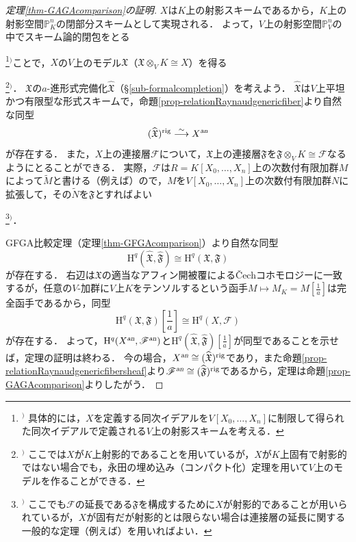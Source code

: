 \documentclass[a4paper,12pt, dvipdfmx]{jsbook}
\def\P{\mathbb{P}}
\def\til#1{\widetilde{#1}}%
\def\rig{\mathop{\mathrm{rig}}\nolimits}
\def\H{\mathrm{H}}
\def\an{\textsl{an}}
\theoremstyle{plain}
\theoremstyle{definition}
\newcounter{chushaku}
\def\chu#1{\addtocounter{chushaku}{1}\footnote[\value{chushaku}]{${}^)$ #1}${}^)$}
\begin{document}
\begin{proof}[定理{\rm \ref{thm-GAGAcomparison}}の証明]
$X$は$K$上の射影スキームであるから，$K$上の射影空間$\P^n_K$の閉部分スキームとして実現される．
よって，$V$上の射影空間$\P^n_V$の中でスキーム論的閉包をとる\chu{具体的には，$X$を定義する同次イデアルを$V[X_0,\ldots,X_n]$に制限して得られた同次イデアルで定義される$V$上の射影スキームを考える．}ことで，$X$の$V$上のモデル$\mathfrak{X}$（$\mathfrak{X}\otimes_VK\cong X$）を得る\chu{ここでは$X$が$K$上射影的であることを用いているが，$X$が$K$上固有で射影的ではない場合でも，永田の埋め込み（コンパクト化）定理を用いて$V$上のモデルを作ることができる．}．
$\mathfrak{X}$の$a$-進形式完備化$\widehat{\mathfrak{X}}$（\S\ref{sub-formalcompletion}）を考えよう．
$\widehat{\mathfrak{X}}$は$V$上平坦かつ有限型な形式スキームで，命題\ref{prop-relationRaynaudgenericfiber}より自然な同型
$$
(\widehat{\mathfrak{X}})^{\rig}\stackrel{\sim}{\longrightarrow}X^{\an}
$$
が存在する．
また，$X$上の連接層$\mathscr{F}$について，$\mathfrak{X}$上の連接層$\mathfrak{F}$を$\mathfrak{F}\otimes_VK\cong\mathscr{F}$なるようにとることができる．
実際，$\mathscr{F}$は$R=K[X_0,\ldots,X_n]$上の次数付有限加群$M$によって$\til{M}$と書ける（例えば\cite[Chap.\ II, Prop.\ 5.15]{Hart2}）ので，$M$を$V[X_0,\ldots,X_n]$上の次数付有限加群$N$に拡張して，その$\til{N}$を$\mathfrak{F}$とすればよい\chu{ここでも$\mathscr{F}$の延長である$\mathfrak{F}$を構成するために$X$が射影的であることが用いられているが，$X$が固有だが射影的とは限らない場合は連接層の延長に関する一般的な定理（例えば\cite[$\mathbf{I}$, (9.4.5)]{EGA}）を用いればよい．}．

GFGA比較定理（定理\ref{thm-GFGAcomparison}）より自然な同型
$$
\H^q(\widehat{\mathfrak{X}},\widehat{\mathfrak{F}})\cong\H^q(\mathfrak{X},\mathfrak{F})
$$
が存在する．
右辺は$\mathfrak{X}$の適当なアフィン開被覆による\v{C}echコホモロジーに一致するが，任意の$V$-加群に$V$上$K$をテンソルするという函手$M\mapsto M_K=M[\frac{1}{a}]$は完全函手であるから，同型
$$
{\textstyle \H^q(\mathfrak{X},\mathfrak{F})[\frac{1}{a}]\cong\H^q(X,\mathscr{F})}
$$
が存在する．
よって，$\H^q(X^{\an},\mathscr{F}^{\an})$と$\H^q(\widehat{\mathfrak{X}},\widehat{\mathfrak{F}})[\frac{1}{a}]$が同型であることを示せば，定理の証明は終わる．
今の場合，$X^{\an}\cong(\widehat{\mathfrak{X}})^{\rig}$であり，また命題\ref{prop-relationRaynaudgenericfibersheaf}より$\mathscr{F}^{\an}\cong(\widehat{\mathfrak{F}})^{\rig}$であるから，定理は命題\ref{prop-GAGAcomparison}よりしたがう．
\end{proof}
\end{document}
